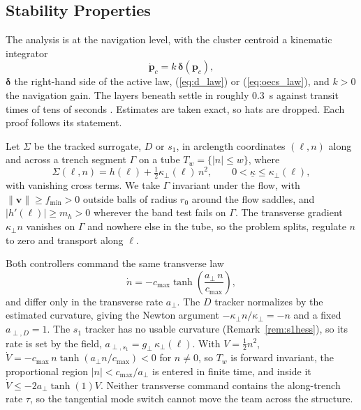 \documentclass[lettersize,journal]{IEEEtran}
\begin{document}
\subsection{Stability Properties}
\label{sec:stability}

The analysis is at the navigation level, with the cluster centroid a
kinematic integrator
\begin{equation}
    \dot{\mathbf{p}}_c = k\,\boldsymbol{\delta}(\mathbf{p}_c),
    \label{eq:kinematic_model}
\end{equation}
$\boldsymbol{\delta}$ the right-hand side of the active law,
(\ref{eq:d_law}) or (\ref{eq:oecs_law}), and $k > 0$ the navigation
gain. The layers beneath settle in roughly 0.3~s against transit times
of tens of seconds \cite{9}. Estimates are taken exact, so hats are
dropped. Each proof follows its statement.

Let $\Sigma$ be the tracked surrogate, $D$ or $s_1$, in arclength
coordinates $(\ell, n)$ along and across a trench segment $\Gamma$ on a
tube $T_w = \{|n| \leq w\}$, where
\begin{equation}
    \Sigma(\ell, n) = h(\ell)
        + \tfrac{1}{2}\kappa_\perp(\ell)\,n^2,
    \qquad 0 < \underline{\kappa} \leq \kappa_\perp(\ell),
    \label{eq:normal_form}
\end{equation}
with vanishing cross terms. We take $\Gamma$ invariant under the flow,
with $\lVert\mathbf{v}\rVert \geq f_{\min} > 0$ outside balls of radius
$r_0$ around the flow saddles, and $|h'(\ell)| \geq m_h > 0$ wherever
the band test fails on $\Gamma$. The transverse gradient $\kappa_\perp
n$ vanishes on $\Gamma$ and nowhere else in the tube, so the problem
splits, regulate $n$ to zero and transport along $\ell$.

Both controllers command the same transverse law
\begin{equation}
    \dot{n} = -c_{\max}\tanh\!\left(
        \frac{a_\perp\,n}{c_{\max}}\right),
    \label{eq:n_dynamics}
\end{equation}
and differ only in the transverse rate $a_\perp$. The $D$ tracker
normalizes by the estimated curvature, giving the Newton argument
$-\kappa_\perp n/\kappa_\perp = -n$ and a fixed $a_{\perp,D} = 1$. The
$s_1$ tracker has no usable curvature (Remark~\ref{rem:s1hess}), so its
rate is set by the field, $a_{\perp,s_1} = g_\perp\,\kappa_\perp(\ell)$.
With $V = \tfrac{1}{2}n^2$, $\dot{V} = -c_{\max}\,n\tanh(a_\perp
n/c_{\max}) < 0$ for $n \neq 0$, so $T_w$ is forward invariant, the
proportional region $|n| < c_{\max}/a_\perp$ is entered in finite time,
and inside it $\dot{V} \leq -2a_\perp\tanh(1)V$. Neither transverse
command contains the along-trench rate $\tau$, so the tangential mode
switch cannot move the team across the structure.
\end{document}
